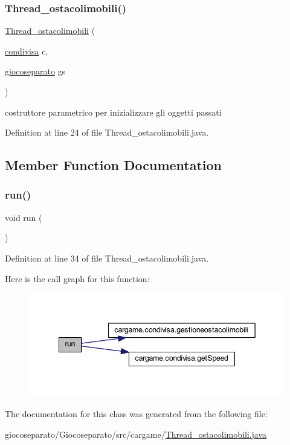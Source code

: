 \subsubsection{\texorpdfstring{Thread\+\_\+ostacolimobili()}{Thread\_ostacolimobili()}}
{\footnotesize\ttfamily \hyperlink{classcargame_1_1_thread__ostacolimobili}{Thread\+\_\+ostacolimobili} (\begin{DoxyParamCaption}\item[{\hyperlink{classcargame_1_1condivisa}{condivisa}}]{c,  }\item[{\hyperlink{classcargame_1_1giocoseparato}{giocoseparato}}]{gs }\end{DoxyParamCaption})}



costruttore parametrico per inizializzare gli oggetti passati 



Definition at line 24 of file Thread\+\_\+ostacolimobili.\+java.



\subsection{Member Function Documentation}
\mbox{\label{classcargame_1_1_thread__ostacolimobili_a13a43e6d814de94978c515cb084873b1}} 
\subsubsection{\texorpdfstring{run()}{run()}}
{\footnotesize\ttfamily void run (\begin{DoxyParamCaption}{ }\end{DoxyParamCaption})}



Definition at line 34 of file Thread\+\_\+ostacolimobili.\+java.

Here is the call graph for this function\+:
\nopagebreak
\begin{figure}[H]
\begin{center}
\leavevmode
\includegraphics[width=342pt]{classcargame_1_1_thread__ostacolimobili_a13a43e6d814de94978c515cb084873b1_cgraph}
\end{center}
\end{figure}


The documentation for this class was generated from the following file\+:\begin{DoxyCompactItemize}
\item 
giocoseparato/\+Giocoseparato/src/cargame/\hyperlink{_thread__ostacolimobili_8java}{Thread\+\_\+ostacolimobili.\+java}\end{DoxyCompactItemize}
